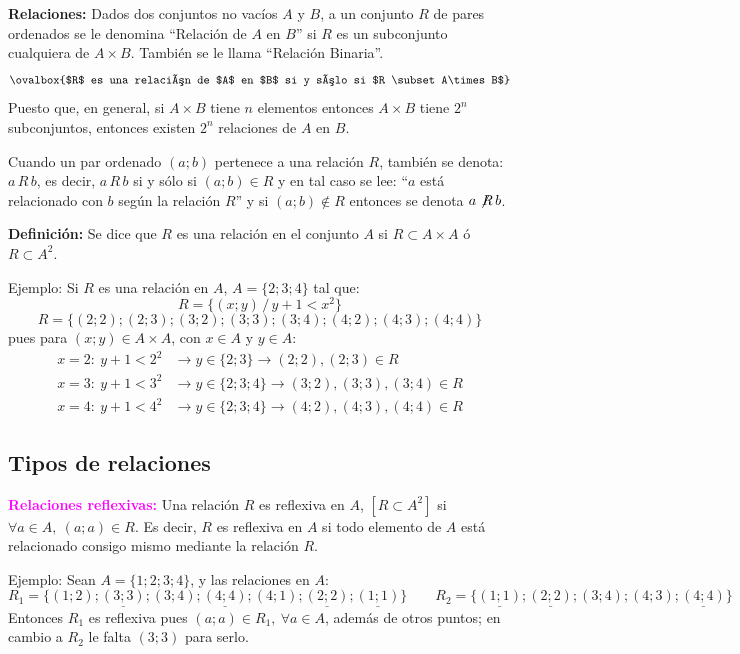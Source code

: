 \documentclass[11pt,a4paper]{article}
\begin{document}
\textbf{Relaciones:} Dados dos conjuntos no vacíos $A$ y $B$, a un conjunto $R$ de pares
ordenados se le denomina ``Relación de $A$ en $B$'' si $R$ es un subconjunto cualquiera de
$A\times B$. También se le llama ``Relación Binaria''.
\[\ovalbox{$R$ es una relación de $A$ en $B$ si y sólo si $R \subset A\times B$}\]
Puesto que, en general, si $A\times B$ tiene $n$ elementos entonces $A\times B$ tiene $2^n$
subconjuntos, entonces existen $2^n$ relaciones de $A$ en $B$.

Cuando un par ordenado $(a;b)$ pertenece a una relación $R$, también se denota: $a\,R\,b$,
es decir, $a\,R\,b$ si y sólo si $(a;b) \in R$ y en tal caso se lee: ``$a$ está relacionado
con $b$ según la relación $R$'' y si $(a;b) \notin R$ entonces se denota $a \not\!R\, b$.

\textbf{Definición:} Se dice que $R$ es una relación en el conjunto $A$ si
$R \subset A\times A$ ó $R \subset A^2$.

Ejemplo: Si $R$ es una relación en $A$, $A = \{2; 3; 4\}$ tal que:
\[R = \{(x;y) \,/\, y + 1 < x^2\}\]
\[R = \{(2;2); (2;3); (3;2); (3;3); (3;4); (4;2); (4;3); (4;4)\}\]
pues para $(x;y) \in A\times A$, con $x \in A$ y $y \in A$:
\begin{align*}
x = 2:\ y + 1 < 2^2 &\longrightarrow y \in \{2; 3\} \longrightarrow (2;2), (2;3) \in R\\
x = 3:\ y + 1 < 3^2 &\longrightarrow y \in \{2; 3; 4\} \longrightarrow (3;2), (3;3), (3;4) \in R\\
x = 4:\ y + 1 < 4^2 &\longrightarrow y \in \{2; 3; 4\} \longrightarrow (4;2), (4;3), (4;4) \in R
\end{align*}

\subsection*{Tipos de relaciones}

\textcolor{magenta}{\textbf{Relaciones reflexivas:}} Una relación $R$ es reflexiva en $A$,
$[R \subset A^2]$ si $\forall a \in A,\ (a;a) \in R$. Es decir, $R$ es reflexiva en $A$ si todo
elemento de $A$ está relacionado consigo mismo mediante la relación $R$.

Ejemplo: Sean $A = \{1; 2; 3; 4\}$, y las relaciones en $A$:
\[
R_1 = \{(1;2); \underline{(3;3)}; (3;4); \underline{(4;4)}; (4;1); \underline{(2;2)}; \underline{(1;1)}\}
\qquad
R_2 = \{\underline{(1;1)}; \underline{(2;2)}; (3;4); (4;3); \underline{(4;4)}\}
\]
Entonces $R_1$ es reflexiva pues $(a;a) \in R_1,\ \forall a \in A$, además de otros puntos; en
cambio a $R_2$ le falta $(3;3)$ para serlo.
\end{document}
